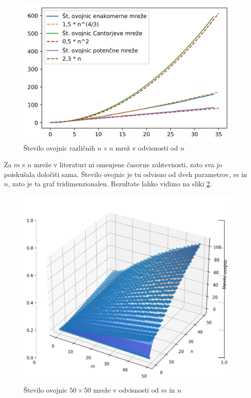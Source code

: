 \documentclass[a4paper]{article}
\begin{document}
\begin{figure}[!h]
	\centering
	\caption{Število ovojnic različnih $n \times n$ mrež v odvisnosti od $n$}
	\label{fig:st_ovojnic}
	\includegraphics[scale=0.6]{slike/st_ovojnic.jpg}
\end{figure}

Za $m \times n$ mreže v literaturi ni omenjene časovne zahtevnosti, zato sva jo poiskušala določiti sama. Število ovojnic je tu odvisno od dveh parametrov, $m$ in $n$, zato je ta graf 
tridimenzionalen. Rezultate lahko vidimo na sliki \ref{fig:3d}.

\begin{figure}[!h]
	\centering
	\caption{Število ovojnic $50 \times 50$ mreže v odvisnosti od $m$ in $n$}
	\label{fig:3d}
	\includegraphics[scale=0.4]{slike/mxn_3d.jpg}
\end{figure}
\end{document}
